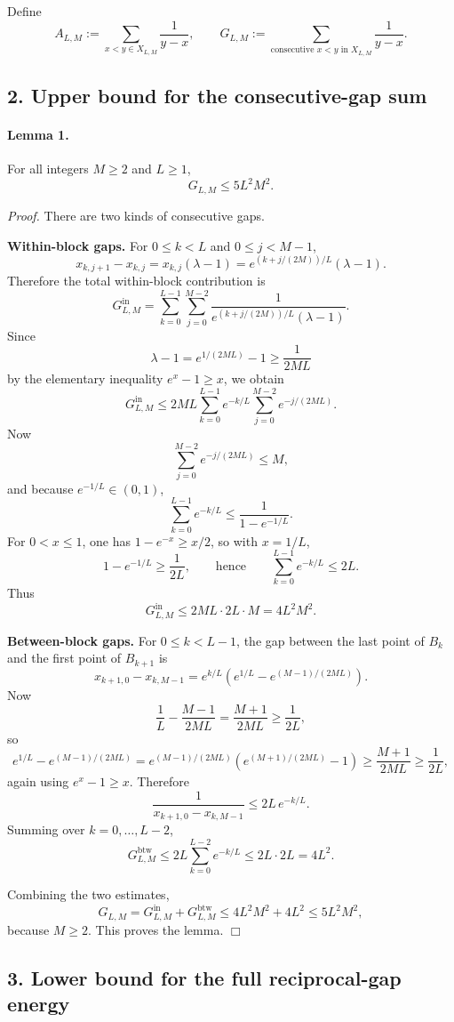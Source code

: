 Define
\[
A_{L,M}:=\sum_{x<y\in X_{L,M}}\frac{1}{y-x},
\qquad
G_{L,M}:=\sum_{\text{consecutive }x<y\text{ in }X_{L,M}}\frac{1}{y-x}.
\]

\subsection*{2. Upper bound for the consecutive-gap sum}

\paragraph{Lemma 1.}
For all integers \(M\ge 2\) and \(L\ge 1\),
\[
G_{L,M}\le 5L^2M^2.
\]

\emph{Proof.}
There are two kinds of consecutive gaps.

\medskip
\noindent\textbf{Within-block gaps.}
For \(0\le k<L\) and \(0\le j<M-1\),
\[
x_{k,j+1}-x_{k,j}=x_{k,j}(\lambda-1)=e^{(k+j/(2M))/L}(\lambda-1).
\]
Therefore the total within-block contribution is
\[
G^{\mathrm{in}}_{L,M}
=
\sum_{k=0}^{L-1}\sum_{j=0}^{M-2}
\frac{1}{e^{(k+j/(2M))/L}(\lambda-1)}.
\]
Since
\[
\lambda-1=e^{1/(2ML)}-1\ge \frac{1}{2ML}
\]
by the elementary inequality \(e^x-1\ge x\), we obtain
\[
G^{\mathrm{in}}_{L,M}
\le 2ML\sum_{k=0}^{L-1}e^{-k/L}\sum_{j=0}^{M-2}e^{-j/(2ML)}.
\]
Now
\[
\sum_{j=0}^{M-2}e^{-j/(2ML)}\le M,
\]
and because \(e^{-1/L}\in (0,1)\),
\[
\sum_{k=0}^{L-1}e^{-k/L}
\le \frac{1}{1-e^{-1/L}}.
\]
For \(0<x\le 1\), one has \(1-e^{-x}\ge x/2\), so with \(x=1/L\),
\[
1-e^{-1/L}\ge \frac{1}{2L},
\qquad\text{hence}
\qquad
\sum_{k=0}^{L-1}e^{-k/L}\le 2L.
\]
Thus
\[
G^{\mathrm{in}}_{L,M}\le 2ML\cdot 2L\cdot M=4L^2M^2.
\]

\medskip
\noindent\textbf{Between-block gaps.}
For \(0\le k<L-1\), the gap between the last point of \(B_k\) and the first point of \(B_{k+1}\) is
\[
x_{k+1,0}-x_{k,M-1}
=e^{k/L}\left(e^{1/L}-e^{(M-1)/(2ML)}\right).
\]
Now
\[
\frac{1}{L}-\frac{M-1}{2ML}=\frac{M+1}{2ML}\ge \frac{1}{2L},
\]
so
\[
e^{1/L}-e^{(M-1)/(2ML)}
=e^{(M-1)/(2ML)}\left(e^{(M+1)/(2ML)}-1\right)
\ge \frac{M+1}{2ML}
\ge \frac{1}{2L},
\]
again using \(e^x-1\ge x\). Therefore
\[
\frac{1}{x_{k+1,0}-x_{k,M-1}}
\le 2L\,e^{-k/L}.
\]
Summing over \(k=0,\dots,L-2\),
\[
G^{\mathrm{btw}}_{L,M}
\le 2L\sum_{k=0}^{L-2}e^{-k/L}
\le 2L\cdot 2L=4L^2.
\]

Combining the two estimates,
\[
G_{L,M}=G^{\mathrm{in}}_{L,M}+G^{\mathrm{btw}}_{L,M}
\le 4L^2M^2+4L^2
\le 5L^2M^2,
\]
because \(M\ge 2\). This proves the lemma.
\hfill\(\Box\)

\subsection*{3. Lower bound for the full reciprocal-gap energy}

